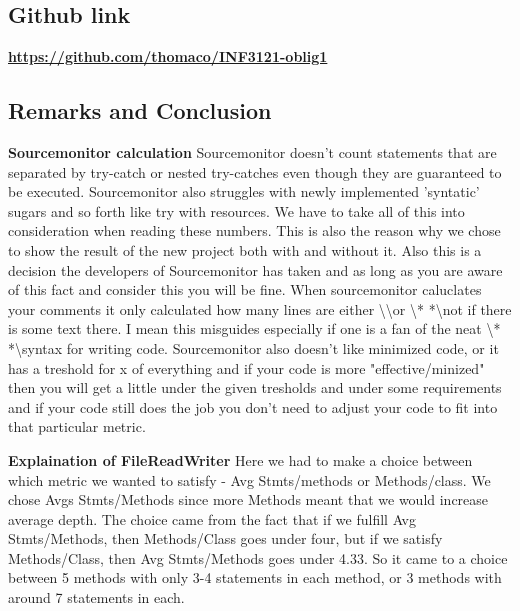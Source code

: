 \documentclass{article}
\begin{document}
\subsection{Github link}
\href{https://github.com/thomaco/INF3121-oblig1}{\textbf{https://github.com/thomaco/INF3121-oblig1}}

\subsection{Remarks and Conclusion}%
\textbf{Sourcemonitor calculation\newline}
Sourcemonitor doesn't count statements that are separated
by try-catch or nested try-catches even though they are guaranteed to be
executed.  Sourcemonitor also struggles with newly implemented 'syntatic' sugars and so forth like
try with resources. We have to take all of this into consideration when reading these numbers.
This is also the reason why we chose to show the result of the new project both with and without it.
Also this is a decision the developers of Sourcemonitor has taken and as long as you are aware of this fact and consider this you will be fine. \newline
When sourcemonitor caluclates your comments it only calculated how many lines are either \textbackslash \textbackslash or \textbackslash* * *\textbackslash not if there is some text there. I mean this misguides especially if one is a fan of the neat \textbackslash* * *\textbackslash syntax for writing code. Sourcemonitor also doesn't like minimized code, or it has a treshold for x of everything
and if your code is more "effective/minized" then you will get a little under the given
tresholds and under some requirements and if your code still does the job you don't need to
adjust your code to fit into that particular metric. 


\textbf{Explaination of FileReadWriter\newline}
Here we had to make a choice between which metric we wanted to satisfy -
Avg Stmts/methods or Methods/class. We chose Avgs Stmts/Methods since
more Methods meant that we would increase average depth. The choice
came from the fact that if we fulfill Avg Stmts/Methods, then
Methods/Class goes under four, but if we satisfy Methods/Class, then
Avg Stmts/Methods goes under 4.33. So it came to a choice between
5 methods with only 3-4 statements in each method, or 3 methods with
around 7 statements in each. \newline
\end{document}
